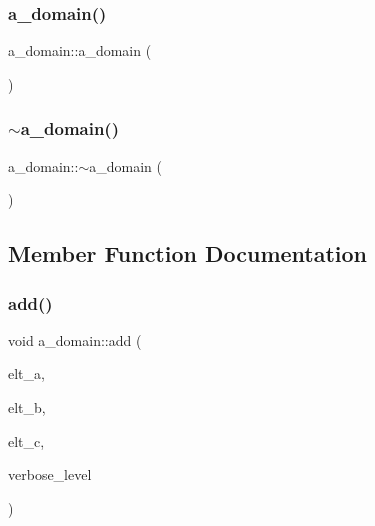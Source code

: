 \subsubsection{\texorpdfstring{a\+\_\+domain()}{a\_domain()}}
{\footnotesize\ttfamily a\+\_\+domain\+::a\+\_\+domain (\begin{DoxyParamCaption}{ }\end{DoxyParamCaption})}

\mbox{\label{classa__domain_ab4aa2109781732d1c606c30c9f987016}} 
\subsubsection{\texorpdfstring{$\sim$a\+\_\+domain()}{~a\_domain()}}
{\footnotesize\ttfamily a\+\_\+domain\+::$\sim$a\+\_\+domain (\begin{DoxyParamCaption}{ }\end{DoxyParamCaption})}



\subsection{Member Function Documentation}
\mbox{\label{classa__domain_a837c1a316f72a0ab7741314c048a9233}} 
\subsubsection{\texorpdfstring{add()}{add()}}
{\footnotesize\ttfamily void a\+\_\+domain\+::add (\begin{DoxyParamCaption}\item[{\mbox{\hyperlink{galois_8h_a09fddde158a3a20bd2dcadb609de11dc}{I\+NT}} $\ast$}]{elt\+\_\+a,  }\item[{\mbox{\hyperlink{galois_8h_a09fddde158a3a20bd2dcadb609de11dc}{I\+NT}} $\ast$}]{elt\+\_\+b,  }\item[{\mbox{\hyperlink{galois_8h_a09fddde158a3a20bd2dcadb609de11dc}{I\+NT}} $\ast$}]{elt\+\_\+c,  }\item[{\mbox{\hyperlink{galois_8h_a09fddde158a3a20bd2dcadb609de11dc}{I\+NT}}}]{verbose\+\_\+level }\end{DoxyParamCaption})}

